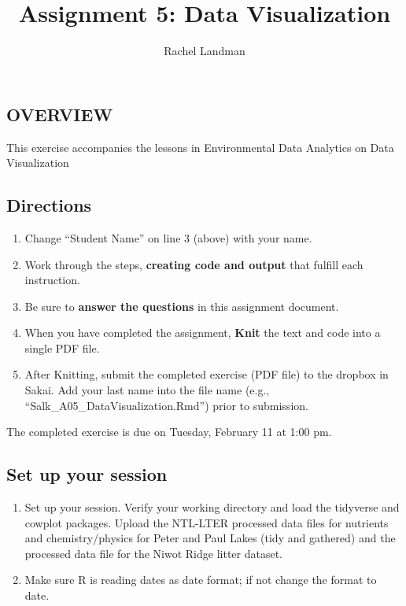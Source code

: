 \documentclass[]{article}
\title{Assignment 5: Data Visualization}
\author{Rachel Landman}
\date{}
\providecommand{\tightlist}{%
  \setlength{\itemsep}{0pt}\setlength{\parskip}{0pt}}
\begin{document}
\maketitle

\hypertarget{overview}{%
\subsection{OVERVIEW}\label{overview}}

This exercise accompanies the lessons in Environmental Data Analytics on
Data Visualization

\hypertarget{directions}{%
\subsection{Directions}\label{directions}}

\begin{enumerate}
\def\labelenumi{\arabic{enumi}.}
\tightlist
\item
  Change ``Student Name'' on line 3 (above) with your name.
\item
  Work through the steps, \textbf{creating code and output} that fulfill
  each instruction.
\item
  Be sure to \textbf{answer the questions} in this assignment document.
\item
  When you have completed the assignment, \textbf{Knit} the text and
  code into a single PDF file.
\item
  After Knitting, submit the completed exercise (PDF file) to the
  dropbox in Sakai. Add your last name into the file name (e.g.,
  ``Salk\_A05\_DataVisualization.Rmd'') prior to submission.
\end{enumerate}

The completed exercise is due on Tuesday, February 11 at 1:00 pm.

\hypertarget{set-up-your-session}{%
\subsection{Set up your session}\label{set-up-your-session}}

\begin{enumerate}
\def\labelenumi{\arabic{enumi}.}
\item
  Set up your session. Verify your working directory and load the
  tidyverse and cowplot packages. Upload the NTL-LTER processed data
  files for nutrients and chemistry/physics for Peter and Paul Lakes
  (tidy and gathered) and the processed data file for the Niwot Ridge
  litter dataset.
\item
  Make sure R is reading dates as date format; if not change the format
  to date.
\end{enumerate}
\end{document}
